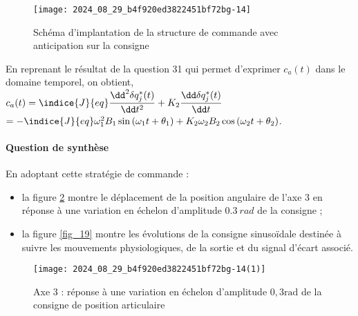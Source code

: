 \begin{figure}[!h]
\centering
\texttt{[image: 2024\_08\_29\_b4f920ed3822451bf72bg-14]}
\caption{\label{fig_17} Schéma d'implantation de la structure de commande avec anticipation sur la consigne}
\end{figure}

\ifprof
\begin{corrige}
En reprenant le résultat de la question 31 qui permet d'exprimer $c_a(t)$ dans le domaine temporel, on obtient, $
c_a(t)=\indice{J}{eq}\dfrac{\dd ^2\delta q^*_j(t)}{\dd t^2}+K_{2}\dfrac{\dd \delta q^*_j(t)}{\dd t}$
$=-\indice{J}{eq}\omega_1^2B_1\sin\left(\omega_1t+\theta_1\right)+K_2\omega_2B_2\cos\left(\omega_2t+\theta_2\right)
$.
\end{corrige}
\else
\fi


\paragraph*{Question de synthèse}

En adoptant cette stratégie de commande :
\begin{itemize}
  \item la figure \ref{fig_18} montre le déplacement de la position angulaire de l'axe 3 en réponse à une variation en échelon d'amplitude $\SI{0,3}{rad}$ de la consigne ;
  \item la figure \ref{fig_19} montre les évolutions de la consigne sinusoïdale destinée à suivre les mouvements physiologiques, de la sortie et du signal d'écart associé.
\end{itemize}

\begin{figure}[!h]
\centering
\texttt{[image: 2024\_08\_29\_b4f920ed3822451bf72bg-14(1)]}

\caption{\label{fig_18} Axe 3 : réponse à une variation en échelon d'amplitude $0,3 \mathrm{rad}$ de la consigne de position articulaire}
\end{figure}

